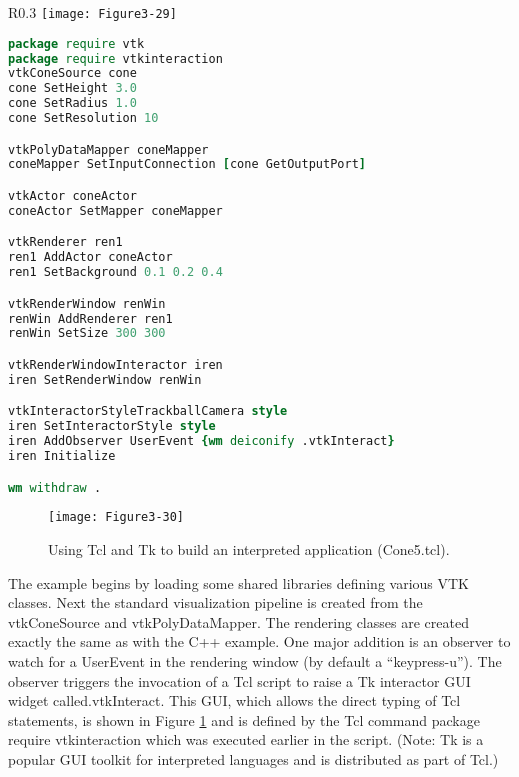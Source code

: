 \begin{wrapfigure}{R}{0.3\linewidth}
  \centering
  \texttt{[image: Figure3-29]}\\
  \caption{In VTK the C++ library is automatically wrapped with the interpreted languages Tcl, Python, and Java.}\label{fig:Figure3-29}
\end{wrapfigure}

\begin{lstlisting}[language=TCL, caption={Cone5.tcl}]
package require vtk
package require vtkinteraction
vtkConeSource cone
cone SetHeight 3.0
cone SetRadius 1.0
cone SetResolution 10

vtkPolyDataMapper coneMapper
coneMapper SetInputConnection [cone GetOutputPort]

vtkActor coneActor
coneActor SetMapper coneMapper

vtkRenderer ren1
ren1 AddActor coneActor
ren1 SetBackground 0.1 0.2 0.4

vtkRenderWindow renWin
renWin AddRenderer ren1
renWin SetSize 300 300

vtkRenderWindowInteractor iren
iren SetRenderWindow renWin

vtkInteractorStyleTrackballCamera style
iren SetInteractorStyle style
iren AddObserver UserEvent {wm deiconify .vtkInteract}
iren Initialize

wm withdraw .
\end{lstlisting}

\begin{figure}[!htb]
  \centering
  \texttt{[image: Figure3-30]}\\
  \caption{Using Tcl and Tk to build an interpreted application (Cone5.tcl).}\label{fig:Figure3-30}
\end{figure}

The example begins by loading some shared libraries defining various VTK classes. Next the standard visualization pipeline is created from the vtkConeSource and vtkPolyDataMapper. The rendering classes are created exactly the same as with the C++ example. One major addition is an observer to watch for a UserEvent in the rendering window (by default a ``keypress-u''). The observer triggers the invocation of a Tcl script to raise a Tk interactor GUI widget called.vtkInteract. This GUI, which allows the direct typing of Tcl statements, is shown in Figure \ref{fig:Figure3-30} and is defined by the Tcl command package require vtkinteraction which was executed earlier in the script. (Note: Tk is a popular GUI toolkit for interpreted languages and is distributed as part of Tcl.) 

